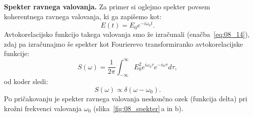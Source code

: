 \begin{example}{\bf Spekter ravnega valovanja.}
Za primer si oglejmo spekter povsem koherentnega ravnega valovanja, ki ga zapišemo
kot:
\begin{equation}
E(t) = E_0 e^{-i\omega_0 t}.
\label{eq:08_27}
\end{equation}
Avtokorelacijsko funkcijo takega valovanja smo že izračunali (enačba~\ref{eq:08_14}), zdaj
pa izračunajmo še spekter kot Fourierevo transformiranko avtokorelacijske funkcije:
\begin{equation}
S(\omega) = \frac{1}{2\pi}\int_{-\infty}^{\infty} E_0^2 e^{i\omega_0 \tau} e^{-i\omega \tau} d\tau,
\label{eq:08_201}
\end{equation}
od koder sledi:
\begin{equation}
S(\omega) \propto \delta (\omega - \omega_0).
\label{eq:08_202}
\end{equation}
Po pričakovanju je spekter ravnega valovanja neskončno ozek (funkcija delta) pri krožni
frekvenci valovanja $\omega_0$ (slika~\ref{fig:08_spekter}\,a in b).
\end{example}

